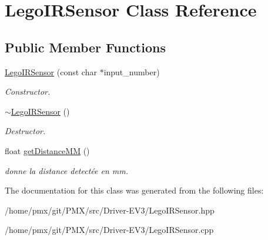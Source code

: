 \hypertarget{classLegoIRSensor}{}\section{Lego\+I\+R\+Sensor Class Reference}
\label{classLegoIRSensor}
\subsection*{Public Member Functions}
\begin{DoxyCompactItemize}
\item 
\mbox{\label{classLegoIRSensor_a65e6b652ab38461dd844bd2289efd349}} 
\hyperlink{classLegoIRSensor_a65e6b652ab38461dd844bd2289efd349}{Lego\+I\+R\+Sensor} (const char $\ast$input\+\_\+number)
\begin{DoxyCompactList}\small\item\em Constructor. \end{DoxyCompactList}\item 
\mbox{\label{classLegoIRSensor_abbcc196b40f335dc8ebf85905a7e315d}} 
\hyperlink{classLegoIRSensor_abbcc196b40f335dc8ebf85905a7e315d}{$\sim$\+Lego\+I\+R\+Sensor} ()
\begin{DoxyCompactList}\small\item\em Destructor. \end{DoxyCompactList}\item 
\mbox{\label{classLegoIRSensor_a94694d63327f48588de060ae1c4cd149}} 
float \hyperlink{classLegoIRSensor_a94694d63327f48588de060ae1c4cd149}{get\+Distance\+MM} ()
\begin{DoxyCompactList}\small\item\em donne la distance detectée en mm. \end{DoxyCompactList}\end{DoxyCompactItemize}


The documentation for this class was generated from the following files\+:\begin{DoxyCompactItemize}
\item 
/home/pmx/git/\+P\+M\+X/src/\+Driver-\/\+E\+V3/Lego\+I\+R\+Sensor.\+hpp\item 
/home/pmx/git/\+P\+M\+X/src/\+Driver-\/\+E\+V3/Lego\+I\+R\+Sensor.\+cpp\end{DoxyCompactItemize}
